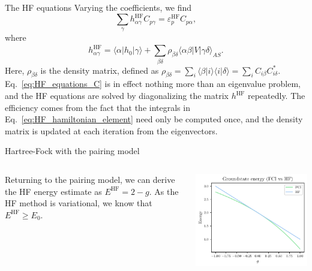 \documentclass[UKenglish,aspectratio=169]{beamer}
\begin{document}
\begin{frame}{The HF equations}
    Varying the coefficients, we find
    \begin{equation}\label{eq:HF_equations_C}
        \sum_{\gamma} h_{\alpha\gamma}^{\mathrm{HF}} C_{p \gamma}
        = \varepsilon_p^{\mathrm{HF}} C_{p \alpha},
    \end{equation}
    where
    \begin{equation}\label{eq:HF_hamiltonian_element}
        h_{\alpha \gamma}^\mathrm{HF}
        = \langle \alpha \vert \hat{h}_0 \vert \gamma \rangle
        + \sum_{\beta\delta} \rho_{\beta\delta} \langle \alpha\beta \vert V \vert \gamma\delta \rangle_{AS}.
    \end{equation}
    Here, $\rho_{\beta\delta}$ is the density matrix, defined as
    $\rho_{\beta\delta} = \sum_{i} \langle \beta \vert i \rangle
    \langle i \vert \delta \rangle = \sum_{i} C_{i\beta} C_{i\delta}^*$.
    Eq.~\eqref{eq:HF_equations_C} is in effect nothing more than an
    eigenvalue problem, and the HF equations are solved by
    diagonalizing the matrix $h^\mathrm{HF}$ repeatedly.
    The efficiency comes from the fact that the integrals in
    Eq.~\eqref{eq:HF_hamiltonian_element} need only be computed once,
    and the density matrix is updated at each iteration from the eigenvectors.
\end{frame}

\begin{frame}{Hartree-Fock with the pairing model}
    \begin{columns}
        \begin{column}{.49\textwidth}
            Returning to the pairing model, we can derive the HF energy estimate as $E^{\mathrm{HF}} = 2 - g$.
            As the HF method is variational, we know that $E^{\mathrm{HF}} \geq E_0$.
        \end{column}

        \begin{column}{.49\textwidth}
            \includegraphics[width=\textwidth]{../midterm2/figures/e_groundstate_energy.pdf}
        \end{column}
    \end{columns}
\end{frame}
\end{document}
